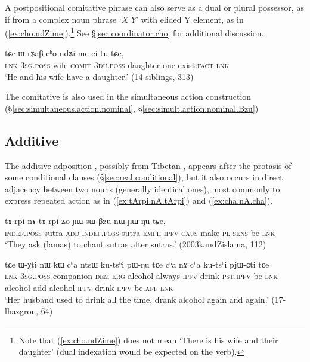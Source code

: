 A postpositional comitative phrase can also serve as a dual or plural possessor, as if from a complex noun phrase `$X$  $Y$' with elided Y element, as in (\ref{ex:cho.ndZime}).\footnote{Note that (\ref{ex:cho.ndZime}) does not mean `There is his wife and their daughter' (dual indexation would be expected on the verb).} See §\ref{sec:coordinator.cho} for additional discussion.

\begin{exe}
\ex \label{ex:cho.ndZime}
\gll tɕe ɯ-rʑaβ cʰo ndʑi-me ci tu tɕe, \\
\textsc{lnk} \textsc{3sg}.\textsc{poss}-wife \textsc{comit} \textsc{3du}.\textsc{poss}-daughter one exist:\textsc{fact} \textsc{lnk} \\
\glt `He and his wife have a daughter.' (14-siblings, 313)
\end{exe}
 
The comitative is also used in the simultaneous action construction (§\ref{sec:simultaneous.action.nominal}, §\ref{sec:simult.action.nominal.Bzu})
 
\subsection{Additive} \label{sec:additive.nA} 
The additive adposition , possibly from Tibetan , appears after the protasis of some conditional clauses (§\ref{sec:real.conditional}), but it also occurs in direct adjacency between two nouns (generally identical ones), most commonly to express  repeated action as in (\ref{ex:tArpi.nA.tArpi}) and (\ref{ex:cha.nA.cha}).
 
\begin{exe}
\ex  \label{ex:tArpi.nA.tArpi}
\gll tɤ-rpi nɤ tɤ-rpi ʑo ɲɯ-sɯ-βzu-nɯ ɲɯ-ŋu tɕe, \\
\textsc{indef}.\textsc{poss}-sutra \textsc{add} \textsc{indef}.\textsc{poss}-sutra \textsc{emph} \textsc{ipfv}-\textsc{caus}-make-\textsc{pl} \textsc{sens}-be \textsc{lnk} \\
\glt `They ask (lamas) to chant sutras after sutras.' (2003kandZislama, 112)
\end{exe} 

 \begin{exe}
\ex  \label{ex:cha.nA.cha}
\gll  tɕe ɯ-χti nɯ kɯ cʰa ntsɯ ku-tsʰi pɯ-ŋu tɕe cʰa nɤ cʰa ku-tsʰi pjɯ-ɕti tɕe \\
\textsc{lnk} \textsc{3sg}.\textsc{poss}-companion \textsc{dem} \textsc{erg} alcohol always \textsc{ipfv}-drink \textsc{pst}.\textsc{ipfv}-be \textsc{lnk} alcohol add alcohol \textsc{ipfv}-drink \textsc{ipfv}-be.\textsc{aff} \textsc{lnk} \\
\glt  `Her husband used to drink all the time, drank alcohol again and again.' (17-lhazgron, 64)
\end{exe} 

